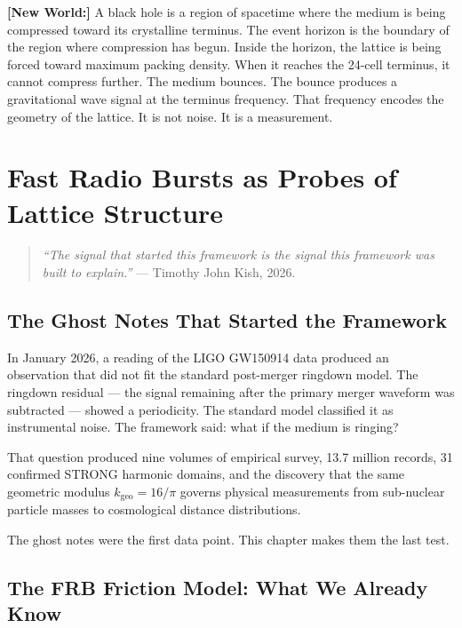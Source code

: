 \documentclass[11pt, letterpaper, openany]{book}
\newcommand{\newworld}[1]{\noindent\textbf{\color{kishblue}[New World:]}
  #1\medskip}
\begin{document}
\newworld{A black hole is a region of spacetime where the medium is being
compressed toward its crystalline terminus. The event horizon is the boundary
of the region where compression has begun. Inside the horizon, the lattice
is being forced toward maximum packing density. When it reaches the 24-cell
terminus, it cannot compress further. The medium bounces. The bounce produces
a gravitational wave signal at the terminus frequency. That frequency encodes
the geometry of the lattice. It is not noise. It is a measurement.}

\clearpage
\chapter{Fast Radio Bursts as Probes of Lattice Structure}

\begin{quote}
\textit{``The signal that started this framework is the signal
this framework was built to explain.''} --- Timothy John Kish, 2026.
\end{quote}

\section{The Ghost Notes That Started the Framework}

In January 2026, a reading of the LIGO GW150914 data produced an observation
that did not fit the standard post-merger ringdown model. The ringdown
residual --- the signal remaining after the primary merger waveform was
subtracted --- showed a periodicity. The standard model classified it as
instrumental noise. The framework said: what if the medium is ringing?

That question produced nine volumes of empirical survey, 13.7 million records,
31 confirmed STRONG harmonic domains, and the discovery that the same geometric
modulus $k_\text{geo} = 16/\pi$ governs physical measurements from sub-nuclear
particle masses to cosmological distance distributions.

The ghost notes were the first data point. This chapter makes them the last test.

\section{The FRB Friction Model: What We Already Know}
\end{document}
